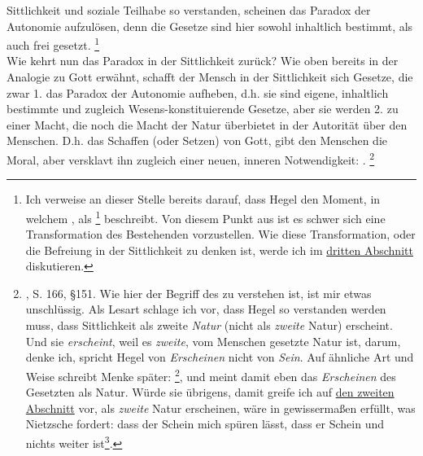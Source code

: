 \documentclass[12pt, a4paper, openany]{report}
\begin{document}
Sittlichkeit und soziale Teilhabe so verstanden, scheinen das Paradox der Autonomie aufzulösen, denn die Gesetze sind hier sowohl inhaltlich bestimmt, als auch frei gesetzt.%
\footnote{
    Ich verweise an dieser Stelle bereits darauf, dass Hegel den Moment, in welchem , als \footcite[][§147, S. 163.]{hegel_grundlinien_2017} beschreibt. 
    Von diesem Punkt aus ist es schwer sich eine Transformation des Bestehenden vorzustellen.
    Wie diese Transformation, oder die Befreiung in der Sittlichkeit zu denken ist, werde ich im \hyperref[abschnitt_3]{dritten Abschnitt} diskutieren.
}\\

Wie kehrt nun das Paradox in der Sittlichkeit zurück? 
Wie oben bereits in der Analogie zu Gott erwähnt, schafft der Mensch in der Sittlichkeit sich Gesetze, die zwar 1. das Paradox der Autonomie aufheben, d.h. sie sind eigene, inhaltlich bestimmte und zugleich Wesens-konstituierende Gesetze, aber sie werden 2. zu einer Macht, die noch die Macht der Natur überbietet in der Autorität über den Menschen.
D.h. das Schaffen (oder Setzen) von Gott, gibt den Menschen die Moral, aber versklavt ihn zugleich einer neuen, inneren Notwendigkeit: .%
\footnote{\cite{hegel_grundlinien_2017}, S. 166, §151.
    Wie hier der Begriff des  zu verstehen ist, ist mir etwas unschlüssig. 
    Als Lesart schlage ich vor, dass Hegel so verstanden werden muss, dass Sittlichkeit als zweite \emph{Natur} (nicht als \emph{zweite} Natur) erscheint. 
    Und sie \emph{erscheint}, weil es \emph{zweite}, vom Menschen gesetzte Natur ist, darum, denke ich, spricht Hegel von \emph{Erscheinen} nicht von \emph{Sein}.
    Auf ähnliche Art und Weise schreibt Menke später: \footcite[][142]{menke_autonomie_2018}, und meint damit eben das \emph{Erscheinen} des Gesetzten als Natur.
    Würde sie übrigens, damit greife ich auf \hyperref[abschnitt_2]{den zweiten Abschnitt} vor, als \emph{zweite} Natur erscheinen, wäre in gewissermaßen erfüllt, was Nietzsche fordert: 
    dass der Schein mich spüren lässt, dass er Schein und nichts weiter ist\footcite[Vlg.][416.]{nietzsche_morgenrote_1999}.
}
\end{document}
